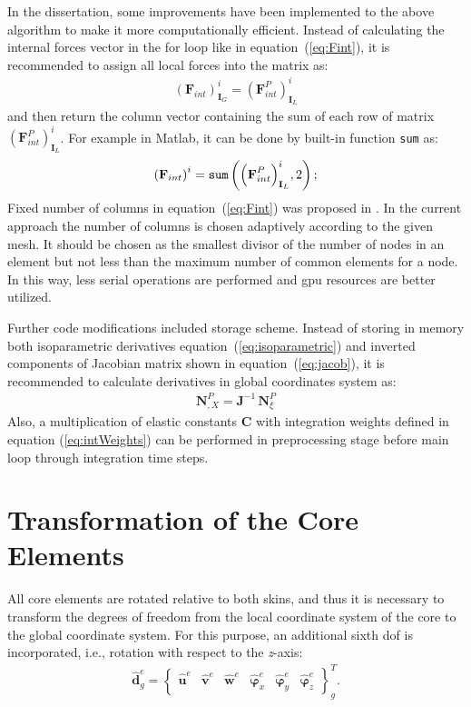 \documentclass[11pt,a4paper,final]{report}
\begin{document}
In the dissertation, some improvements have been implemented to the above algorithm to make it more computationally efficient.
Instead of calculating the internal forces vector in the for loop like in equation~(\ref{eq:Fint}), it is recommended to assign all local forces into the matrix as:
\begin{eqnarray}
	\label{eq:Fmatrix}
	{\left(\textbf{F}_{int}\right)}^i_{\textbf{I}_G} ={\left(\textbf{F}^P_{int}\right)}^i_{\textbf{I}_L}
\end{eqnarray}
and then return the column vector containing the sum of each row of matrix \({\left(\textbf{F}^P_{int}\right)}^i_{\textbf{I}_L}\).
For example in Matlab, it can be done by built-in function \verb|sum| as:
\begin{eqnarray}
	\label{eq:Fsum}
	{\left(\textbf{F}_{int}\right)}^i = \verb|sum| \left({\left(\textbf{F}^P_{int}\right)}^i_{\textbf{I}_L},2\right);
\end{eqnarray}
Fixed number of columns in equation~(\ref{eq:Fint}) was proposed in \cite{kudela2016parallel}. In the current approach the number of columns is chosen adaptively according to the given mesh. It should be chosen as the smallest divisor of the number of nodes in an element but not less than the maximum number of common elements for a node. In this way, less serial operations are performed and \ac{gpu} resources are better utilized.

Further code modifications included storage scheme. Instead of storing in memory both isoparametric derivatives equation~(\ref{eq:isoparametric}) and inverted components of Jacobian matrix shown in equation~(\ref{eq:jacob}), it is recommended to calculate derivatives in global coordinates system as:
\begin{eqnarray}
	\textbf{N}^P_{,X} = \textbf{J}^{-1}\,\textbf{N}^P_{\xi} 
\end{eqnarray}
Also, a multiplication of elastic constants \(\textbf{C}\) with integration weights defined in equation (\ref{eq:intWeights}) can be performed in preprocessing stage before main loop through integration time steps.
 \section{Transformation of the Core Elements}
\label{sec:transformation}

All core elements are rotated relative to both skins, and thus it is necessary to transform the degrees of freedom from the local coordinate system of the core to the global coordinate system.
For this purpose, an additional sixth \ac{dof} is incorporated, i.e., rotation with respect to the \textit{z}-axis:
\begin{eqnarray}
	\widehat{\textbf{d}}^e_g = \left \{\begin{array}{cccccc}
		\widehat{\textbf{u}}^e & \widehat{\textbf{v}}^e &
		\widehat{\textbf{w}}^e & \widehat{\boldsymbol{\varphi}}_x^e &
		\widehat{\boldsymbol{\varphi}}_y^e & \widehat{\boldsymbol{\varphi}}_z^e
	\end{array}\right \}^T_g.
	\label{eq:d6}
\end{eqnarray}
\end{document}
